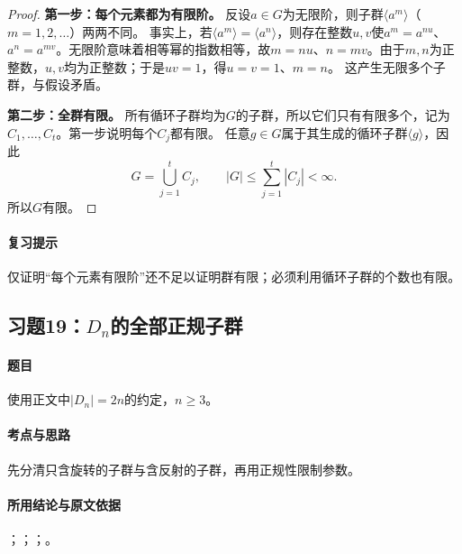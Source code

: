 
\begin{proof}
\textbf{第一步：每个元素都为有限阶。}
反设$a\in G$为无限阶，则子群$\langle a^m\rangle$（$m=1,2,\ldots$）两两不同。
事实上，若$\langle a^m\rangle=\langle a^n\rangle$，则存在整数$u,v$使$a^m=a^{nu}$、$a^n=a^{mv}$。无限阶意味着相等幂的指数相等，故$m=nu$、$n=mv$。由于$m,n$为正整数，$u,v$均为正整数；于是$uv=1$，得$u=v=1$、$m=n$。
这产生无限多个子群，与假设矛盾。

\textbf{第二步：全群有限。}
所有循环子群均为$G$的子群，所以它们只有有限多个，记为$C_1,\ldots,C_t$。第一步说明每个$C_j$都有限。
任意$g\in G$属于其生成的循环子群$\langle g\rangle$，因此
\[
G=\bigcup_{j=1}^{t}C_j,\qquad |G|\leq\sum_{j=1}^{t}|C_j|<\infty.
\]
所以$G$有限。
\end{proof}

\paragraph{复习提示}
仅证明“每个元素有限阶”还不足以证明群有限；必须利用循环子群的个数也有限。


\subsection{习题19：\texorpdfstring{$D_n$的全部正规子群}{Dn的全部正规子群}}
\label{ex:1:19}

\paragraph{题目}
使用正文中$|D_n|=2n$的约定，$n\geq3$。

\paragraph{考点与思路}
先分清只含旋转的子群与含反射的子群，再用正规性限制参数。

\paragraph{所用结论与原文依据}
；；；。


